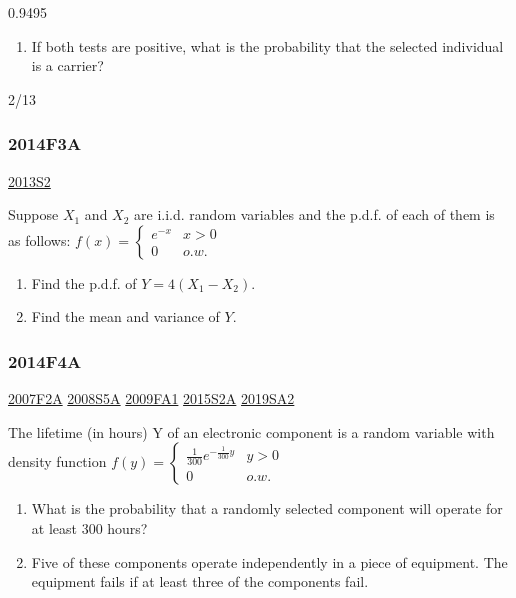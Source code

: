 \documentclass[10pt,twocolumn,portrait]{article}
\providecommand{\tightlist}{%
  \setlength{\itemsep}{0pt}\setlength{\parskip}{0pt}}
\begin{document}
0.9495

\begin{enumerate}
\def\labelenumi{(\alph{enumi})}
\setcounter{enumi}{1}
\tightlist
\item
  If both tests are positive, what is the probability that the selected
  individual is a carrier?
\end{enumerate}

2/13

\hypertarget{f3a-1}{%
\subsubsection{2014F3A}\label{f3a-1}}

\protect\hyperlink{s2-3}{2013S2}

Suppose \(X_1\) and \(X_2\) are i.i.d. random variables and the p.d.f.
of each of them is as follows:
\(f(x)=\begin{cases}e^{-x}& x>0\\0& o.w.\end{cases}\)

\begin{enumerate}
\def\labelenumi{(\alph{enumi})}
\item
  Find the p.d.f. of \(Y=4(X_1-X_2)\).
\item
  Find the mean and variance of \(Y\).
\end{enumerate}

\hypertarget{f4a-1}{%
\subsubsection{2014F4A}\label{f4a-1}}

\protect\hyperlink{f2a}{2007F2A} \protect\hyperlink{s5a}{2008S5A}
\protect\hyperlink{fa1}{2009FA1} \protect\hyperlink{s2a-1}{2015S2A}
\protect\hyperlink{sa2-3}{2019SA2}

The lifetime (in hours) Y of an electronic component is a random
variable with density function
\(f(y)=\begin{cases}\frac1{300}e^{-\frac1{300}y}& y>0\\0& o.w.\end{cases}\)

\begin{enumerate}
\def\labelenumi{(\alph{enumi})}
\item
  What is the probability that a randomly selected component will
  operate for at least 300 hours?
\item
  Five of these components operate independently in a piece of
  equipment. The equipment fails if at least three of the components
  fail.
\end{enumerate}
\end{document}
